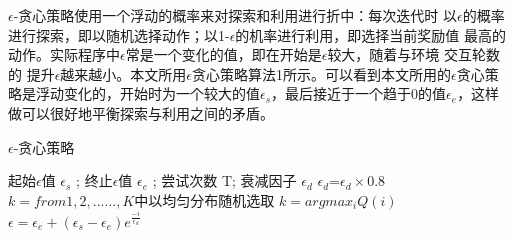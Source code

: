 $\epsilon$-贪心策略使用一个浮动的概率来对探索和利用进行折中：每次迭代时
以$\epsilon$的概率进行探索，即以随机选择动作；以1-$\epsilon$的机率进行利用，即选择当前奖励值
最高的动作。实际程序中$\epsilon$常是一个变化的值，即在开始是$\epsilon$较大，随着与环境 交互轮数的
提升$\epsilon$越来越小。本文所用$\epsilon $贪心策略算法1所示。可以看到本文所用的$\epsilon $贪心策略是浮动变化的，开始时为一个较大的值$\epsilon_s$，最后接近于一个趋于0的值$\epsilon_e$，这样做可以很好地平衡探索与利用之间的矛盾。
\begin{algorithm}[H] 
  \caption{$\epsilon$-贪心策略}  
  \begin{algorithmic}[1] 
    \Require 起始$\epsilon$值 $\epsilon_s$ ; 终止$\epsilon$值 $\epsilon_e$ ; 
    尝试次数 T; 衰减因子 $\epsilon_d$
    \Ensure  
      \State $\epsilon_d$=$\epsilon_d\times0.8$
      \EndIf
      \State $k=from 1,2,......,K$中以均匀分布随机选取
      \Else
      \State $k=argmax_{i}Q(i)$
      \EndIf
      \State $\epsilon = \epsilon_e+(\epsilon_s- \epsilon_e)e^{\frac{-i}{\epsilon_d }}$
    \EndFor   
  \end{algorithmic}  
\end{algorithm}

